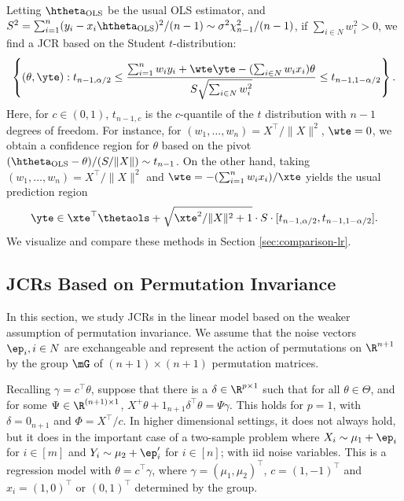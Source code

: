 \documentclass[english]{article}
\begin{document}
Letting $\htheta_{\mathrm{OLS}}$ be the usual OLS estimator,
and
$S^2 = \sum_{i=1}^n (y_i - x_i\htheta_{\mathrm{OLS}})^2/(n-1) \sim \sigma^2 \chi^2_{n-1}/(n-1)$,
if $\sum_{i \in N} w_i^2>0$,
we find a JCR based on the Student $t$-distribution:
\begin{equation}\label{eq:lr-JCR}
    \left\{(\theta,\yte): t_{n-1, \alpha/2} \leq \frac{\sum_{i=1}^n w_i y_i + \wte \yte - (\sum_{i \in N} w_i x_i)\theta}{S\sqrt{\sum_{i \in N} w_i^2}} \leq t_{n-1, 1-\alpha/2}\right\}.
\end{equation}
Here, for $c\in(0,1)$, $t_{n-1,c}$ is the $c$-quantile of the $t$ distribution with $n-1$ degrees of freedom.
For instance, 
for $(w_1,\ldots,w_n) = X^\top/\|X\|^2$, $\wte = 0$, we obtain a confidence region for $\theta$ based on the pivot $(\htheta_{\mathrm{OLS}} - \theta)/(S/\|X\|) \sim t_{n-1}$.
On the other hand, taking $(w_1,\ldots,w_n) = X^\top/\|X\|^2$ and $\wte = -(\sum_{i=1}^n w_i x_i)/\xte$ yields the usual prediction region
$$
    \yte \in \xte^\top\thetaols + 
    \sqrt{\xte^2/\|X\|^2+1}\cdot S\cdot [t_{n-1, \alpha/2},
     t_{n-1, 1 - \alpha/2}].
$$
We visualize and compare these methods in Section \ref{sec:comparison-lr}.



\subsection{JCRs Based on Permutation Invariance}\label{sec:permutation-lr}

In this section, we 
study JCRs in the linear model based on the weaker assumption of permutation invariance. 
We assume that the noise vectors $\ep_i, i \in N$ are exchangeable and
represent the action of permutations on $\R^{n+1}$ by the group $\mG$ of $(n+1)\times(n+1)$ permutation matrices.

Recalling $\gamma = c^\top \theta$, suppose that there is a $\delta \in \R^{p \times 1}$ such that 
for all $\theta\in\Theta$,
and for some $\Psi \in \R^{(n+1) \times 1}$,
$X^{+} \theta + 1_{n+1} \delta^\top \theta = \Psi \gamma$. 
This 
holds for $p=1$,
with $\delta = 0_{n+1}$ and $\Phi = X^\top/c$. 
In higher dimensional settings, 
it does not always hold, but 
it does in the important case of a two-sample 
problem
where 
$X_i \sim \mu_1 + \ep_i$ 
for $i\in [m]$
and 
$Y_i \sim \mu_2 + \ep'_i$
for $i\in [n]$;
with iid noise variables.
This is a regression model
with $\theta = c^\top \gamma$, where $\gamma = (\mu_1,\mu_2)^\top$, $c = (1,-1)^\top$
and $x_i = (1,0)^\top$ or $(0,1)^\top$ determined by the group.
\end{document}
